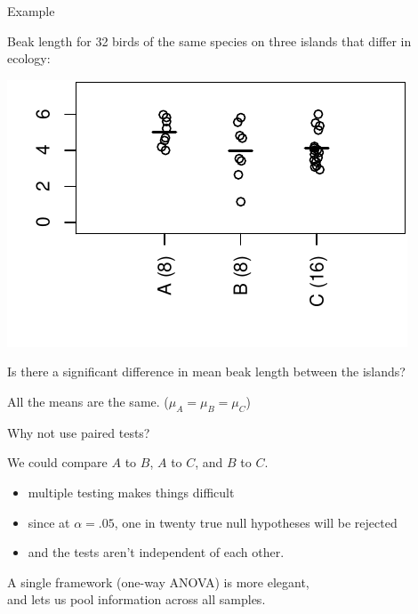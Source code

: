 \begin{frame}{Example}

  Beak length for 32 birds of the same species on three islands that differ in ecology:
\begin{center}
  \includegraphics{dots2ex.pdf}
\end{center}

    \vspace{1em}

     Is there a significant difference in mean beak length between the islands?

    \vspace{2em}

     All the means are the same.
    ($\mu_A = \mu_B = \mu_C$)

\end{frame}

\begin{frame}{Why not use paired tests?}

  We could compare $A$ to $B$, $A$ to $C$, and $B$ to $C$.\\
  \begin{itemize}
    \item \alert{multiple testing} makes things difficult
    \item since at $\alpha=.05$, one in twenty true null hypotheses will be rejected
    \item and the tests aren't independent of each other.
  \end{itemize}

    \vspace{2em}

    A single framework (\alert{one-way ANOVA}) is more elegant,\\
    and lets us \alert{pool information} across all samples.

\end{frame}

